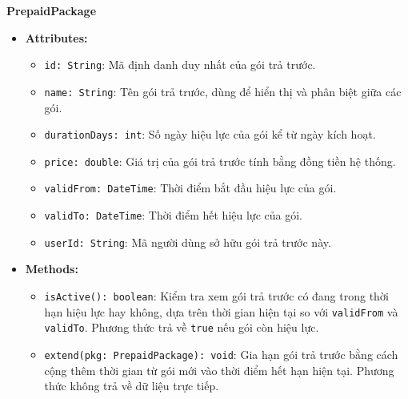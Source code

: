 \noindent\textbf{PrepaidPackage}
\begin{itemize}
	\item \textbf{Attributes:}
	\begin{itemize}
		\item \texttt{id: String}: Mã định danh duy nhất của gói trả trước.
		\item \texttt{name: String}: Tên gói trả trước, dùng để hiển thị và phân biệt giữa các gói.
		\item \texttt{durationDays: int}: Số ngày hiệu lực của gói kể từ ngày kích hoạt.
		\item \texttt{price: double}: Giá trị của gói trả trước tính bằng đồng tiền hệ thống.
		\item \texttt{validFrom: DateTime}: Thời điểm bắt đầu hiệu lực của gói.
		\item \texttt{validTo: DateTime}: Thời điểm hết hiệu lực của gói.
		\item \texttt{userId: String}: Mã người dùng sở hữu gói trả trước này.
	\end{itemize}
	\item \textbf{Methods:}
	\begin{itemize}
		\item \texttt{isActive(): boolean}: Kiểm tra xem gói trả trước có đang trong thời hạn hiệu lực hay không, dựa trên thời gian hiện tại so với \texttt{validFrom} và \texttt{validTo}. Phương thức trả về \texttt{true} nếu gói còn hiệu lực.
		\item \texttt{extend(pkg: PrepaidPackage): void}: Gia hạn gói trả trước bằng cách cộng thêm thời gian từ gói mới vào thời điểm hết hạn hiện tại. Phương thức không trả về dữ liệu trực tiếp.
	\end{itemize}
\end{itemize}

